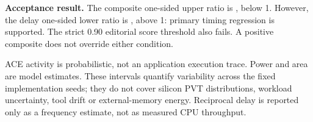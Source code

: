 \begin{scopebox}\textbf{Acceptance result.} The composite one-sided upper ratio is \UpperOneSidedScore{}, below 1. However, the delay one-sided lower ratio is \DelayLowerOneSidedRatio{}, above 1: primary timing regression is supported. The strict 0.90 editorial score threshold also fails. A positive composite does not override either condition.\end{scopebox}

ACE activity is probabilistic, not an application execution trace. Power and area are model estimates. These intervals quantify variability across the fixed implementation seeds; they do not cover silicon PVT distributions, workload uncertainty, tool drift or external-memory energy. Reciprocal delay is reported only as a frequency estimate, not as measured CPU throughput.

